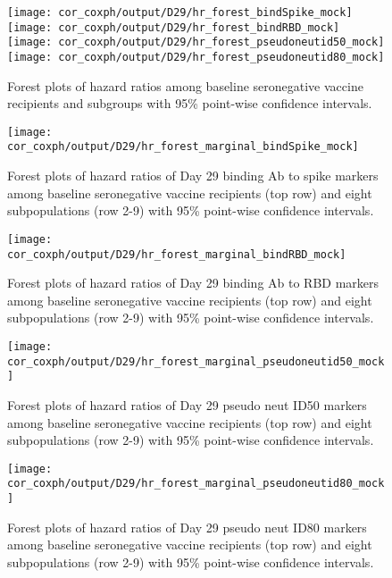 \documentclass[
]{article}
\begin{document}
\begin{figure}[H]
    \texttt{[image: cor\_coxph/output/D29/hr\_forest\_bindSpike\_mock]}
    \texttt{[image: cor\_coxph/output/D29/hr\_forest\_bindRBD\_mock]}
    \texttt{[image: cor\_coxph/output/D29/hr\_forest\_pseudoneutid50\_mock]}
    \texttt{[image: cor\_coxph/output/D29/hr\_forest\_pseudoneutid80\_mock]}
    \caption{Forest plots of hazard ratios among baseline seronegative vaccine recipients and subgroups with 95\% point-wise confidence intervals.}
\end{figure}

\clearpage

\begin{figure}[H]
    \centering
    \texttt{[image: cor\_coxph/output/D29/hr\_forest\_marginal\_bindSpike\_mock]}
    \caption{Forest plots of hazard ratios of Day 29 binding Ab to spike markers among baseline seronegative vaccine recipients (top row) and eight subpopulations (row 2-9) with 95\% point-wise confidence intervals.}
\end{figure}

\begin{figure}[H]
    \centering
    \texttt{[image: cor\_coxph/output/D29/hr\_forest\_marginal\_bindRBD\_mock]}
    \caption{Forest plots of hazard ratios of Day 29 binding Ab to RBD markers among baseline seronegative vaccine recipients (top row) and eight subpopulations (row 2-9) with 95\% point-wise confidence intervals.}
\end{figure}

\begin{figure}[H]
    \centering
    \texttt{[image: cor\_coxph/output/D29/hr\_forest\_marginal\_pseudoneutid50\_mock]}
    \caption{Forest plots of hazard ratios of Day 29 pseudo neut ID50 markers among baseline seronegative vaccine recipients (top row) and eight subpopulations (row 2-9) with 95\% point-wise confidence intervals.}
\end{figure}

\begin{figure}[H]
    \centering
    \texttt{[image: cor\_coxph/output/D29/hr\_forest\_marginal\_pseudoneutid80\_mock]}
    \caption{Forest plots of hazard ratios of Day 29 pseudo neut ID80 markers among baseline seronegative vaccine recipients (top row) and eight subpopulations (row 2-9) with 95\% point-wise confidence intervals.}
\end{figure}
\end{document}
